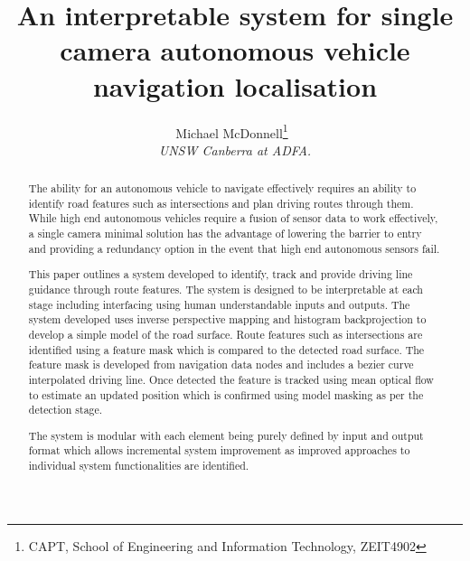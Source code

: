 \documentclass[]{aiaa-tc}%
\title{An interpretable system for single camera autonomous vehicle navigation localisation}
\author{
  Michael McDonnell\thanks{CAPT, School of Engineering and Information Technology, ZEIT4902}\
  \\
  {\normalsize\itshape
   UNSW Canberra at ADFA.}\\
  }
\begin{document}
\maketitle


\begin{abstract}

The ability for an autonomous vehicle to navigate effectively requires an ability to identify road features such as intersections and plan driving routes through them. While high end autonomous vehicles require a fusion of sensor data to work effectively, a single camera minimal solution has the advantage of lowering the barrier to entry and providing a redundancy option in the event that high end autonomous sensors fail.

This paper outlines a system developed to identify, track and provide driving line guidance through route features. The system is designed to be interpretable at each stage including interfacing using human understandable inputs and outputs. The system developed uses inverse perspective mapping and histogram backprojection to develop a simple model of the road surface. Route features such as intersections are identified using a feature mask which is compared to the detected road surface. The feature mask is developed from navigation data nodes and includes a bezier curve interpolated driving line. Once detected the feature is tracked using mean optical flow to estimate an updated position which is confirmed using model masking as per the detection stage.

The system is modular with each element being purely defined by input and output format which allows incremental system improvement as improved approaches to individual system functionalities are identified.

\end{abstract}
%
%
%
%
%
\end{document}

